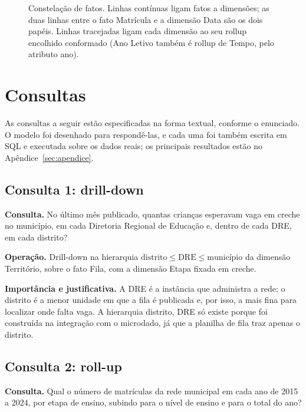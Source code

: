 \documentclass[11pt,a4paper]{article}
\newcommand{\hier}[1]{$#1$}
\begin{document}
\begin{landscape}
\begin{figure}[H]
\centering
\resizebox{\linewidth}{!}{}
\caption{Constelação de fatos. Linhas contínuas ligam fatos a dimensões; as duas linhas entre o fato Matrícula e a dimensão Data são os dois papéis. Linhas tracejadas ligam cada dimensão ao seu rollup encolhido conformado (Ano Letivo também é rollup de Tempo, pelo atributo ano).}
\label{fig:constelacao}
\end{figure}
\end{landscape}

\clearpage
\section{Consultas}

As consultas a seguir estão especificadas na forma textual, conforme o enunciado. O modelo foi desenhado para respondê-las, e cada uma foi também escrita em SQL e executada sobre os dados reais; os principais resultados estão no Apêndice~\ref{sec:apendice}.

\subsection{Consulta 1: drill-down}
\textbf{Consulta.} No último mês publicado, quantas crianças esperavam vaga em creche no município, em cada Diretoria Regional de Educação e, dentro de cada DRE, em cada distrito?

\textbf{Operação.} Drill-down na hierarquia \hier{\text{distrito} \leq \text{DRE} \leq \text{município}} da dimensão Território, sobre o fato Fila, com a dimensão Etapa fixada em creche.

\textbf{Importância e justificativa.} A DRE é a instância que administra a rede; o distrito é a menor unidade em que a fila é publicada e, por isso, a mais fina para localizar onde falta vaga. A hierarquia distrito, DRE só existe porque foi construída na integração com o microdado, já que a planilha de fila traz apenas o distrito.

\subsection{Consulta 2: roll-up}
\textbf{Consulta.} Qual o número de matrículas da rede municipal em cada ano de 2015 a 2024, por etapa de ensino, subindo para o nível de ensino e para o total do ano?
\end{document}
